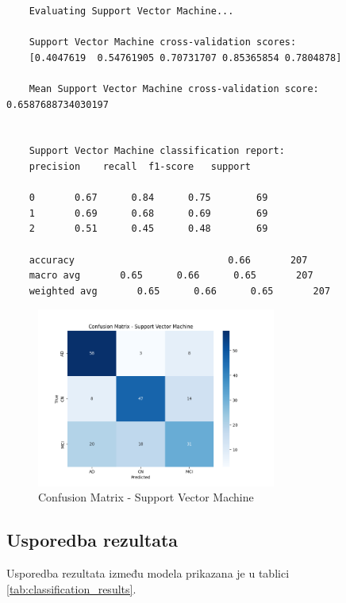 \documentclass[zavrsnirad,upload]{fer}
\begin{document}
\begin{verbatim}
	Evaluating Support Vector Machine...
	
	Support Vector Machine cross-validation scores: 
	[0.4047619  0.54761905 0.70731707 0.85365854 0.7804878]
	
	Mean Support Vector Machine cross-validation score: 0.6587688734030197
	
	
	Support Vector Machine classification report:
	precision    recall  f1-score   support
	
	0       0.67      0.84      0.75        69
	1       0.69      0.68      0.69        69
	2       0.51      0.45      0.48        69
	
	accuracy                           0.66       207    
	macro avg       0.65      0.66      0.65       207
	weighted avg       0.65      0.66      0.65       207
\end{verbatim}

\begin{figure}[h]
	\centering
	\includegraphics[width=0.7\textwidth]{Figures/matrix_svm.png}
	\caption{Confusion Matrix - Support Vector Machine}
	\label{fig:matrix_svm}
\end{figure}

\subsection{Usporedba rezultata}

Usporedba rezultata između modela prikazana je u tablici \ref{tab:classification_results}.
\end{document}

